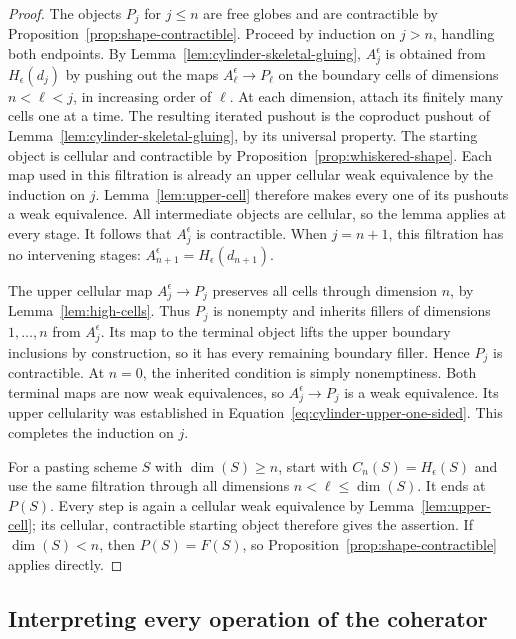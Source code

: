 \documentclass[11pt,letterpaper]{article}
\numberwithin{equation}{section}
\theoremstyle{plain}
\theoremstyle{definition}
\theoremstyle{remark}
\begin{document}
\begin{proof}
The objects \(P_j\) for \(j\le n\) are free globes and are
contractible by Proposition~\ref{prop:shape-contractible}.  Proceed
by induction on \(j>n\), handling both endpoints.  By
Lemma~\ref{lem:cylinder-skeletal-gluing}, \(A_j^\epsilon\) is
obtained from \(H_\epsilon(d_j)\) by pushing out the maps
\(A_\ell^\epsilon\to P_\ell\) on the boundary cells of
dimensions \(n<\ell<j\), in increasing order of \(\ell\).
At each dimension, attach its finitely many cells one at a time.
The resulting iterated pushout is the coproduct pushout of
Lemma~\ref{lem:cylinder-skeletal-gluing}, by its universal property.
The starting object is cellular and contractible by
Proposition~\ref{prop:whiskered-shape}.  Each map used in this
filtration is already an upper cellular weak equivalence by the
induction on \(j\).  Lemma~\ref{lem:upper-cell} therefore makes
every one of its pushouts a weak equivalence.  All intermediate objects
are cellular, so the lemma applies at every stage.  It follows that
\(A_j^\epsilon\) is contractible.  When \(j=n+1\), this
filtration has no intervening stages:
\(A_{n+1}^\epsilon=H_\epsilon(d_{n+1})\).

The upper cellular map \(A_j^\epsilon\to P_j\) preserves all
cells through dimension \(n\), by Lemma~\ref{lem:high-cells}.
Thus \(P_j\) is nonempty and inherits fillers of dimensions
\(1,\ldots,n\) from \(A_j^\epsilon\).  Its map to the
terminal object lifts the upper boundary inclusions by construction,
so it has every remaining boundary filler.  Hence \(P_j\) is
contractible.  At \(n=0\), the inherited condition is simply
nonemptiness.  Both terminal maps are now weak equivalences, so
\(A_j^\epsilon\to P_j\) is a weak equivalence.  Its upper
cellularity was established in Equation~\eqref{eq:cylinder-upper-one-sided}.
This completes the induction on \(j\).

For a pasting scheme \(S\) with \(\dim(S)\ge n\), start with
\(C_n(S)=H_\epsilon(S)\) and use the same filtration through
all dimensions \(n<\ell\le\dim(S)\).  It ends at \(P(S)\).
Every step is again a cellular weak equivalence by
Lemma~\ref{lem:upper-cell}; its cellular, contractible starting object
therefore gives the assertion.  If \(\dim(S)<n\), then
\(P(S)=F(S)\), so Proposition~\ref{prop:shape-contractible}
applies directly.
\end{proof}

\subsection{Interpreting every operation of the coherator}
\end{document}

